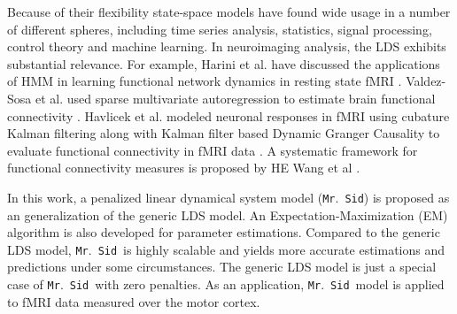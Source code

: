 \documentclass[fleqn]{article}
\newcommand{\mrsid}{{\sc \texttt{Mr}.~\texttt{Sid}}}
\begin{document}
Because of their flexibility state-space models have found wide usage in a number of different spheres, including time series analysis, statistics, signal processing, control theory and machine learning.  In neuroimaging analysis, the LDS exhibits substantial relevance. For example, Harini et al. have discussed the applications of HMM in learning functional network dynamics in resting state fMRI \cite{eavani2013unsupervised}. Valdez-Sosa et al. used sparse multivariate autoregression to estimate brain functional connectivity \cite{valdes2005estimating}. Havlicek et al. modeled neuronal responses in fMRI using cubature Kalman filtering along with Kalman filter based Dynamic Granger Causality to evaluate functional connectivity in fMRI data \cite{havlicek2011dynamic}. A systematic framework for functional connectivity measures is proposed by HE Wang et al \cite{wang2014systematic}.

In this work, a penalized linear dynamical system model (\mrsid) is proposed as an generalization of the generic LDS model. An Expectation-Maximization (EM) algorithm is also developed for parameter estimations. Compared to the generic LDS model, \mrsid~is highly scalable and yields more accurate estimations and predictions under some circumstances. The generic LDS model is just a special case of \mrsid~with zero penalties. As an application, \mrsid~model is applied to fMRI data measured over the motor cortex.
\end{document}
